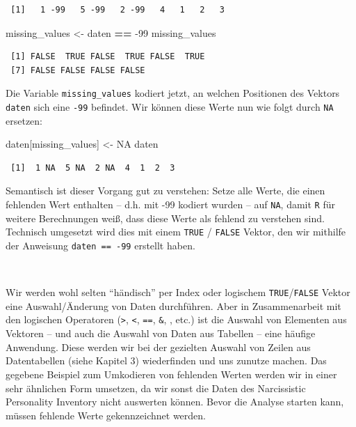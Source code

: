 \documentclass[12pt,]{tufte-book}
\newenvironment{Shaded}{\begin{snugshade}}{\end{snugshade}}
\newcommand{\DecValTok}[1]{\textcolor[rgb]{0.00,0.00,0.81}{#1}}
\newcommand{\StringTok}[1]{\textcolor[rgb]{0.31,0.60,0.02}{#1}}
\newcommand{\OtherTok}[1]{\textcolor[rgb]{0.56,0.35,0.01}{#1}}
\newcommand{\OperatorTok}[1]{\textcolor[rgb]{0.81,0.36,0.00}{\textbf{#1}}}
\newcommand{\NormalTok}[1]{#1}
\theoremstyle{definition}
\theoremstyle{definition}
\theoremstyle{definition}
\theoremstyle{remark}
\begin{document}
\begin{verbatim}
 [1]   1 -99   5 -99   2 -99   4   1   2   3
\end{verbatim}

\begin{Shaded}
\begin{Highlighting}[]
\NormalTok{missing_values <-}\StringTok{ }\NormalTok{daten }\OperatorTok{==}\StringTok{ }\DecValTok{-99}
\NormalTok{missing_values}
\end{Highlighting}
\end{Shaded}

\begin{verbatim}
 [1] FALSE  TRUE FALSE  TRUE FALSE  TRUE
 [7] FALSE FALSE FALSE FALSE
\end{verbatim}

Die Variable \texttt{missing\_values} kodiert jetzt, an welchen
Positionen des Vektors \texttt{daten} sich eine \texttt{-99} befindet.
Wir können diese Werte nun wie folgt durch \texttt{NA} ersetzen:

\begin{Shaded}
\begin{Highlighting}[]
\NormalTok{daten[missing_values] <-}\StringTok{ }\OtherTok{NA}
\NormalTok{daten}
\end{Highlighting}
\end{Shaded}

\begin{verbatim}
 [1]  1 NA  5 NA  2 NA  4  1  2  3
\end{verbatim}

Semantisch ist dieser Vorgang gut zu verstehen: Setze alle Werte, die
einen fehlenden Wert enthalten -- d.h. mit -99 kodiert wurden -- auf
\texttt{NA}, damit \texttt{R} für weitere Berechnungen weiß, dass diese
Werte als fehlend zu verstehen sind. Technisch umgesetzt wird dies mit
einem \texttt{TRUE} / \texttt{FALSE} Vektor, den wir mithilfe der
Anweisung \texttt{daten\ ==\ -99} erstellt haben.

~

Wir werden wohl selten ``händisch'' per Index oder logischem
\texttt{TRUE}/\texttt{FALSE} Vektor eine Auswahl/Änderung von Daten
durchführen. Aber in Zusammenarbeit mit den logischen Operatoren
(\texttt{\textgreater{}}, \texttt{\textless{}}, \texttt{==},
\texttt{\&}, \texttt{\textbar{}}, etc.) ist die Auswahl von Elementen
aus Vektoren -- und auch die Auswahl von Daten aus Tabellen -- eine
häufige Anwendung. Diese werden wir bei der gezielten Auswahl von Zeilen
aus Datentabellen (siehe Kapitel 3) wiederfinden und uns zunutze machen.
Das gegebene Beispiel zum Umkodieren von fehlenden Werten werden wir in
einer sehr ähnlichen Form umsetzen, da wir sonst die Daten des
Narcissistic Personality Inventory nicht auswerten können. Bevor die
Analyse starten kann, müssen fehlende Werte gekennzeichnet werden.
\end{document}
